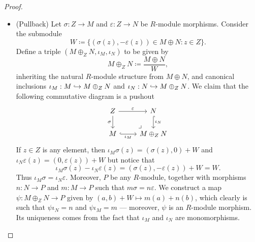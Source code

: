 \begin{proof}
\begin{itemize}
\item (Pullback) Let \(\sigma: Z \to M\) and \(\varepsilon: Z \to N\) be
  \(R\)-module morphisms. Consider the submodule
  \[
  W \coloneq \{(\sigma(z), -\varepsilon(z)) \in M \oplus N \colon
  z \in Z\}.
  \]
  Define a triple \((M \oplus_Z N, \iota_M, \iota_N)\)
  to be given by
  \[
  M \oplus_Z N \coloneq \frac{M \oplus N}{W},
  \]
  inheriting the natural \(R\)-module structure from \(M \oplus N\), and
  canonical inclusions \(\iota_M: M \hookrightarrow M \oplus_Z N\) and
  \(\iota_N: N \hookrightarrow M \oplus_Z N\). We claim that the following commutative
  diagram is a pushout
  \[
  \begin{tikzcd}
  Z \ar[r, "\varepsilon"] \ar[d, "\sigma"']
  \ar[dr, very near end, phantom, "\lrcorner"]
  &N \ar[d, hook, "\iota_N"] \\
  M \ar[r, hook, "\iota_M"'] &M \oplus_Z N
  \end{tikzcd}
  \]
  If \(z \in Z\) is any element, then  \(\iota_M\sigma(z) = (\sigma(z), 0) + W\)
  and \(\iota_N \varepsilon(z) = (0, \varepsilon(z)) + W\) but notice that
  \[
  \iota_M \sigma(z) - \iota_N \varepsilon(z)
  = (\sigma(z), - \varepsilon(z)) + W
  = W.
  \]
  Thus \(\iota_M \sigma = \iota_N \varepsilon\). Moreover, \(P\) be any
  \(R\)-module, together with morphisms \(n: N \to P\) and \(m: M \to P\) such
  that \(m \sigma = n \varepsilon\).  We construct a map
  \(\psi: M \oplus_Z N \to P\) given by \((a, b) + W \mapsto m(a) + n(b)\),
  which clearly is such that \(\psi \iota_N = n\) and \(\psi \iota_M = m\) ---
  moreover, \(\psi\) is an \(R\)-module morphism. Its uniqueness comes from the
  fact that \(\iota_M\) and \(\iota_N\) are monomorphisms.
\end{itemize}
\end{proof}

